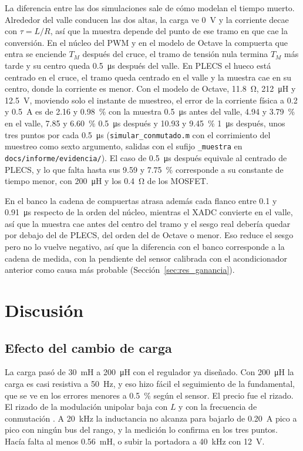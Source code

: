 \documentclass[journal]{IEEEtran}
\begin{document}
La diferencia entre las dos simulaciones sale de cómo modelan el tiempo muerto. Alrededor del valle conducen las dos altas, la carga ve \SI{0}{V} y la corriente decae con $\tau=L/R$, así que la muestra depende del punto de ese tramo en que cae la conversión. En el núcleo del PWM y en el modelo de Octave la compuerta que entra se enciende $T_M$ después del cruce, el tramo de tensión nula termina $T_M$ más tarde y su centro queda \SI{0.5}{\micro s} después del valle. En PLECS el hueco está centrado en el cruce, el tramo queda centrado en el valle y la muestra cae en su centro, donde la corriente es menor. Con el modelo de Octave, \SI{11.8}{\ohm}, \SI{212}{\micro H} y \SI{12.5}{V}, moviendo solo el instante de muestreo, el error de la corriente física a \num{0.2} y \SI{0.5}{A} es de \num{2.16} y \SI{0.98}{\percent} con la muestra \SI{0.5}{\micro s} antes del valle, \num{4.94} y \SI{3.79}{\percent} en el valle, \num{7.85} y \SI{6.60}{\percent} \SI{0.5}{\micro s} después y \num{10.93} y \SI{9.45}{\percent} \SI{1}{\micro s} después, unos tres puntos por cada \SI{0.5}{\micro s} (\texttt{simular\_conmutado.m} con el corrimiento del muestreo como sexto argumento, salidas con el sufijo \texttt{\_muestra} en \texttt{docs/\allowbreak informe/\allowbreak evidencia/}). El caso de \SI{0.5}{\micro s} después equivale al centrado de PLECS, y lo que falta hasta sus \num{9.59} y \SI{7.75}{\percent} corresponde a su constante de tiempo menor, con \SI{200}{\micro H} y los \SI{0.4}{\ohm} de los MOSFET.

En el banco la cadena de compuertas atrasa además cada flanco entre \num{0.1} y \SI{0.91}{\micro s} respecto de la orden del núcleo, mientras el XADC convierte en el valle, así que la muestra cae antes del centro del tramo y el sesgo real debería quedar por debajo del de PLECS, del orden del de Octave o menor. Eso reduce el sesgo pero no lo vuelve negativo, así que la diferencia con el banco corresponde a la cadena de medida, con la pendiente del sensor calibrada con el acondicionador anterior como causa más probable (Sección~\ref{sec:res_ganancia}).

\section{Discusión}
\label{sec:discusion}
\subsection{Efecto del cambio de carga}
La carga pasó de \SI{30}{mH} a \SI{200}{\micro H} con el regulador ya diseñado. Con \SI{200}{\micro H} la carga es casi resistiva a \SI{50}{Hz}, y eso hizo fácil el seguimiento de la fundamental, que se ve en los errores menores a \SI{0.5}{\percent} según el sensor. El precio fue el rizado. El rizado de la modulación unipolar baja con $L$ y con la frecuencia de conmutación \cite[sec.~8-3-2]{mohan2003power}. A \SI{20}{kHz} la inductancia no alcanza para bajarlo de \SI{0.20}{A} pico a pico con ningún bus del rango, y la medición lo confirma en los tres puntos. Hacía falta al menos \SI{0.56}{mH}, o subir la portadora a \SI{40}{kHz} con \SI{12}{V}.
\end{document}
